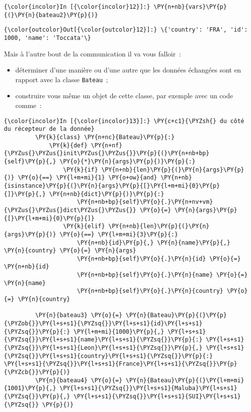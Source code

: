     \begin{Verbatim}[commandchars=\\\{\}]
{\color{incolor}In [{\color{incolor}12}]:} \PY{n+nb}{vars}\PY{p}{(}\PY{n}{bateau2}\PY{p}{)}
\end{Verbatim}


\begin{Verbatim}[commandchars=\\\{\}]
{\color{outcolor}Out[{\color{outcolor}12}]:} \{'country': 'FRA', 'id': 1000, 'name': 'Toccata'\}
\end{Verbatim}
            
    Mais à l'autre bout de la communication il va vous falloir~:

\begin{itemize}
\tightlist
\item
  déterminer d'une manière ou d'une autre que les données échangées sont
  en rapport avec la classe \texttt{Bateau}~;
\item
  construire vous même un objet de cette classe, par exemple avec un
  code comme~:
\end{itemize}

    \begin{Verbatim}[commandchars=\\\{\}]
{\color{incolor}In [{\color{incolor}13}]:} \PY{c+c1}{\PYZsh{} du côté du récepteur de la donnée}
         \PY{k}{class} \PY{n+nc}{Bateau}\PY{p}{:}
             \PY{k}{def} \PY{n+nf}{\PYZus{}\PYZus{}init\PYZus{}\PYZus{}}\PY{p}{(}\PY{n+nb+bp}{self}\PY{p}{,} \PY{o}{*}\PY{n}{args}\PY{p}{)}\PY{p}{:}
                 \PY{k}{if} \PY{n+nb}{len}\PY{p}{(}\PY{n}{args}\PY{p}{)} \PY{o}{==} \PY{l+m+mi}{1} \PY{o+ow}{and} \PY{n+nb}{isinstance}\PY{p}{(}\PY{n}{args}\PY{p}{[}\PY{l+m+mi}{0}\PY{p}{]}\PY{p}{,} \PY{n+nb}{dict}\PY{p}{)}\PY{p}{:}
                     \PY{n+nb+bp}{self}\PY{o}{.}\PY{n+nv+vm}{\PYZus{}\PYZus{}dict\PYZus{}\PYZus{}} \PY{o}{=} \PY{n}{args}\PY{p}{[}\PY{l+m+mi}{0}\PY{p}{]}
                 \PY{k}{elif} \PY{n+nb}{len}\PY{p}{(}\PY{n}{args}\PY{p}{)} \PY{o}{==} \PY{l+m+mi}{3}\PY{p}{:}
                     \PY{n+nb}{id}\PY{p}{,} \PY{n}{name}\PY{p}{,} \PY{n}{country} \PY{o}{=} \PY{n}{args}
                     \PY{n+nb+bp}{self}\PY{o}{.}\PY{n}{id} \PY{o}{=} \PY{n+nb}{id}
                     \PY{n+nb+bp}{self}\PY{o}{.}\PY{n}{name} \PY{o}{=} \PY{n}{name}
                     \PY{n+nb+bp}{self}\PY{o}{.}\PY{n}{country} \PY{o}{=} \PY{n}{country}
         
         \PY{n}{bateau3} \PY{o}{=} \PY{n}{Bateau}\PY{p}{(}\PY{p}{\PYZob{}}\PY{l+s+s1}{\PYZsq{}}\PY{l+s+s1}{id}\PY{l+s+s1}{\PYZsq{}}\PY{p}{:} \PY{l+m+mi}{1000}\PY{p}{,} \PY{l+s+s1}{\PYZsq{}}\PY{l+s+s1}{name}\PY{l+s+s1}{\PYZsq{}}\PY{p}{:} \PY{l+s+s1}{\PYZsq{}}\PY{l+s+s1}{Leon}\PY{l+s+s1}{\PYZsq{}}\PY{p}{,} \PY{l+s+s1}{\PYZsq{}}\PY{l+s+s1}{country}\PY{l+s+s1}{\PYZsq{}}\PY{p}{:} \PY{l+s+s1}{\PYZsq{}}\PY{l+s+s1}{France}\PY{l+s+s1}{\PYZsq{}}\PY{p}{\PYZcb{}}\PY{p}{)}
         \PY{n}{bateau4} \PY{o}{=} \PY{n}{Bateau}\PY{p}{(}\PY{l+m+mi}{1001}\PY{p}{,} \PY{l+s+s1}{\PYZsq{}}\PY{l+s+s1}{Maluba}\PY{l+s+s1}{\PYZsq{}}\PY{p}{,} \PY{l+s+s1}{\PYZsq{}}\PY{l+s+s1}{SUI}\PY{l+s+s1}{\PYZsq{}} \PY{p}{)}
\end{Verbatim}


